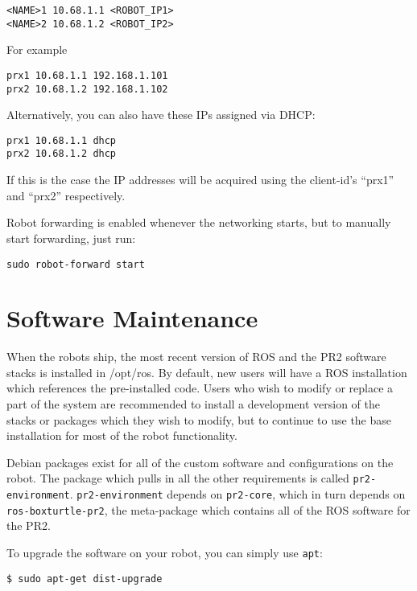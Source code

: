 \begin{verbatim}
<NAME>1 10.68.1.1 <ROBOT_IP1>
<NAME>2 10.68.1.2 <ROBOT_IP2>
\end{verbatim}

For example

\begin{verbatim}
prx1 10.68.1.1 192.168.1.101
prx2 10.68.1.2 192.168.1.102
\end{verbatim}

Alternatively, you can also have these IPs assigned via DHCP:

\begin{verbatim}
prx1 10.68.1.1 dhcp
prx2 10.68.1.2 dhcp
\end{verbatim}

If this is the case the IP addresses will be acquired using the
client-id's ``prx1'' and ``prx2'' respectively.

Robot forwarding is enabled whenever the networking starts, but to
manually start forwarding, just run:

\begin{verbatim}
sudo robot-forward start
\end{verbatim}

\section{Software Maintenance}

When the robots ship, the most recent version of ROS and the PR2
software stacks is installed in /opt/ros.  By default, new users will
have a ROS installation which references the pre-installed code.
Users who wish to modify or replace a part of the system are
recommended to install a development version of the stacks or packages
which they wish to modify, but to continue to use the base
installation for most of the robot functionality.

Debian packages exist for all of the custom software and
configurations on the robot.  The package which pulls in all the other
requirements is called \texttt{pr2-environment}.
\texttt{pr2-environment} depends on \texttt{pr2-core}, which in turn
depends on \texttt{ros-boxturtle-pr2}, the meta-package which contains
all of the ROS software for the PR2.

To upgrade the software on your robot, you can simply use \texttt{apt}:

\begin{verbatim}
$ sudo apt-get dist-upgrade
\end{verbatim}


